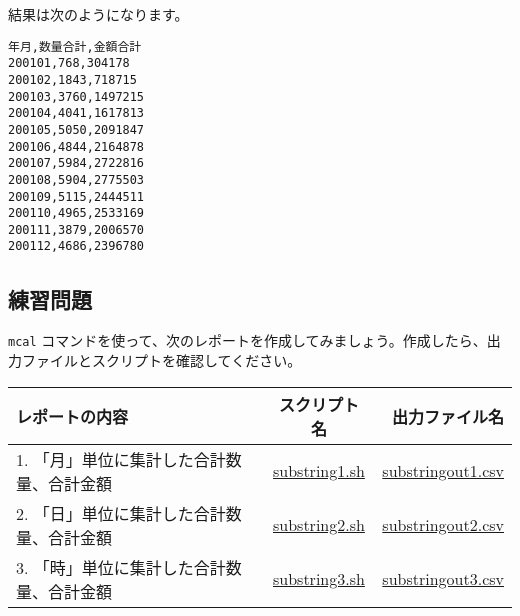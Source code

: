 \noindent
結果は次のようになります。

\begin{verbatim}
年月,数量合計,金額合計
200101,768,304178
200102,1843,718715
200103,3760,1497215
200104,4041,1617813
200105,5050,2091847
200106,4844,2164878
200107,5984,2722816
200108,5904,2775503
200109,5115,2444511
200110,4965,2533169
200111,3879,2006570
200112,4686,2396780
\end{verbatim}

\subsection{練習問題 }

\verb|mcal| コマンドを使って、次のレポートを作成してみましょう。作成したら、出力ファイルとスクリプトを確認してください。

\begin{table}[htbp]
{\small
\begin{tabular}{ l | c || r }
\hline
\textbf{レポートの内容}   & \textbf{スクリプト名} & \textbf{出力ファイル名}  \\
\hline
1. 「月」単位に集計した合計数量、合計金額 & \href{exercise/substring1.sh}{substring1.sh} & \href{exercise/outdat/substringout1.csv}{substringout1.csv} \\
2. 「日」単位に集計した合計数量、合計金額 & \href{exercise/substring2.sh}{substring2.sh} & \href{exercise/outdat/substringout2.csv}{substringout2.csv} \\
3. 「時」単位に集計した合計数量、合計金額 & \href{exercise/substring3.sh}{substring3.sh} & \href{exercise/outdat/substringout3.csv}{substringout3.csv} \\

\hline
\end{tabular} 
}
\end{table} 


%
